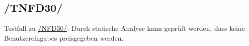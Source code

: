 \subsection*{/TNFD30/}
\label{/TNFD30/} Testfall zu \hyperref[/NFD30/]{/NFD30/}: Durch \gls{statische Analyse} kann geprüft werden, dass keine \Glspl{Benutzereingabe} preisgegeben werden.